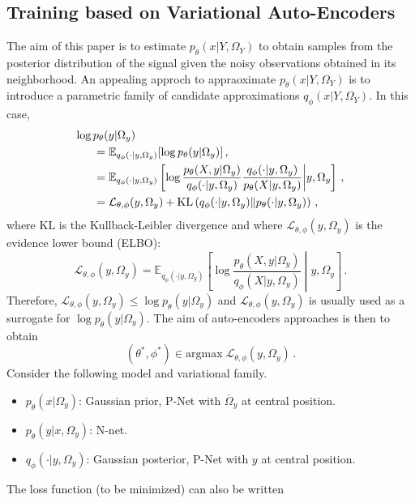 \documentclass[review]{cvpr}
\begin{document}
\subsection{Training based on Variational Auto-Encoders}
The aim of this paper is to estimate $p_{\theta}(x|Y,\Omega_Y)$ to obtain samples from the posterior distribution of the signal given the noisy observations obtained in its neighborhood. An appealing approch to appraoximate $p_{\theta}(x|Y,\Omega_Y)$  is to introduce a parametric family of candidate approximations $q_{\phi}(x|Y,\Omega_Y)$. In this case,
\begin{align*}
\log p_{\theta}(y|\Omega_y) &\\
&\hspace{-1.3cm}= \mathbb{E}_{q_{\phi}(\cdot|y,\Omega_y)}[\log p_{\theta}(y|\Omega_y)]\,,\\
&\hspace{-1.3cm}= \mathbb{E}_{q_{\phi}(\cdot|y,\Omega_y)}\left[\log \frac{p_\theta(X,y|\Omega_y)}{q_{\phi}(\cdot|y,\Omega_y)}\frac{q_{\phi}(\cdot|y,\Omega_y)}{p_\theta(X|y,\Omega_y)}\middle |y,\Omega_y\right]\,,\\
&\hspace{-1.3cm}= \mathcal{L}_{\theta,\phi}(y,\Omega_y) + \mathrm{KL}\left(q_{\phi}(\cdot|y,\Omega_y)\| p_\theta(\cdot|y,\Omega_y)\right)\,,
\end{align*}
where $ \mathrm{KL}$ is the Kullback-Leibler divergence and where $\mathcal{L}_{\theta,\phi}(y,\Omega_y)$ is the evidence lower bound (ELBO):
$$
 \mathcal{L}_{\theta,\phi}(y,\Omega_y)  = \mathbb{E}_{q_{\phi}(\cdot|y,\Omega_y)}\left[\log \frac{p_\theta(X,y|\Omega_y)}{q_{\phi}(X|y,\Omega_y)}\middle |y,\Omega_y\right]\,.
$$
Therefore, $ \mathcal{L}_{\theta,\phi}(y,\Omega_y) \leqslant \log p_{\theta}(y|\Omega_y)$ and $ \mathcal{L}_{\theta,\phi}(y,\Omega_y)$ is usually used as a surrogate for $ \log p_{\theta}(y|\Omega_y)$. The aim of auto-encoders approaches is then to obtain
$$
(\theta^*,\phi^*) \in \mathrm{argmax} \; \mathcal{L}_{\theta,\phi}(y,\Omega_y)\,.
$$
Consider the following model and variational family.
\begin{itemize}
\item $p_\theta(x|\Omega_y)$: Gaussian prior, P-Net with $\overline \Omega_y$ at central position.
\item $p_\theta(y|x,\Omega_y)$: N-net.
\item $q_{\phi}(\cdot|y,\Omega_y)$: Gaussian posterior, P-Net with $y$ at central position.
\end{itemize}
The loss function (to be minimized) can also be written
\end{document}

